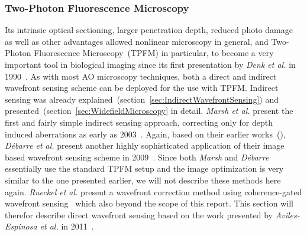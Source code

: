 \subsubsection{Two-Photon Fluorescence Microscopy}
\label{sec:twoPhotonExcitation}

Its intrinsic optical sectioning, larger penetration depth, reduced photo damage as well as other advantages allowed nonlinear microscopy in general, and Two-Photon Fluorescence Microscopy~(TPFM) in particular, to become a very important tool in biological imaging since its first presentation by \emph{Denk et al.} in 1990~\cite{scan_TPFM_principle}. As with most AO microscopy techniques, both a direct and indirect wavefront sensing scheme can be deployed for the use with TPFM. Indirect sensing was already explained~(section~\ref{sec:IndirectWavefrontSensing}) and presented~(section~\ref{sec:WidefieldMicroscopy} in detail. \emph{Marsh et al.} present the first and fairly simple indirect sensing approach, correcting only for depth induced aberrations as early as 2003~\cite{scan_TPFM_pratical}. Again, based on their earlier works~(\cite{wide_AOM_loew_freq,wide_AOM_structured_illu}), \emph{D\'{e}barre et al.} present another highly sophisticated application of their image based wavefront sensing scheme in 2009~\cite{scan_TPFM_image_based}. Since both \emph{Marsh} and \emph{D\'{e}barre} essentially use the standard TPFM setup and the image optimization is very similar to the one presented earlier, we will not describe these methods here again. \emph{Rueckel et al.} present a wavefront correction method using coherence-gated wavefront sensing~\cite{scan_TPFM_gated_wavefront} which also beyond the scope of this report. This section will therefor describe direct wavefront sensing based on the work presented by \emph{Aviles-Espinosa et al.} in 2011~\cite{scan_TPFM_guide_start}.\newline

